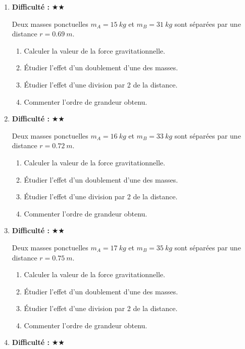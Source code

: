 \documentclass[11pt,a4paper]{article}
\newcommand{\etoiles}[1]{\textbf{Difficulté : }#1}
\begin{document}
\begin{enumerate}[label=\textbf{Exercice \arabic*.},leftmargin=*]
Deux masses ponctuelles $m_A=14\ \si{kg}$ et $m_B=29\ \si{kg}$ sont séparées par une distance $r=0.66\ \si{m}$.
\begin{enumerate}[label=\alph*)]
\item Calculer la valeur de la force gravitationnelle.
\item Étudier l'effet d'un doublement d'une des masses.
\item Étudier l'effet d'une division par 2 de la distance.
\item Commenter l'ordre de grandeur obtenu.
\end{enumerate}
\item \etoiles{★★}

Deux masses ponctuelles $m_A=15\ \si{kg}$ et $m_B=31\ \si{kg}$ sont séparées par une distance $r=0.69\ \si{m}$.
\begin{enumerate}[label=\alph*)]
\item Calculer la valeur de la force gravitationnelle.
\item Étudier l'effet d'un doublement d'une des masses.
\item Étudier l'effet d'une division par 2 de la distance.
\item Commenter l'ordre de grandeur obtenu.
\end{enumerate}
\item \etoiles{★★}

Deux masses ponctuelles $m_A=16\ \si{kg}$ et $m_B=33\ \si{kg}$ sont séparées par une distance $r=0.72\ \si{m}$.
\begin{enumerate}[label=\alph*)]
\item Calculer la valeur de la force gravitationnelle.
\item Étudier l'effet d'un doublement d'une des masses.
\item Étudier l'effet d'une division par 2 de la distance.
\item Commenter l'ordre de grandeur obtenu.
\end{enumerate}
\item \etoiles{★★}

Deux masses ponctuelles $m_A=17\ \si{kg}$ et $m_B=35\ \si{kg}$ sont séparées par une distance $r=0.75\ \si{m}$.
\begin{enumerate}[label=\alph*)]
\item Calculer la valeur de la force gravitationnelle.
\item Étudier l'effet d'un doublement d'une des masses.
\item Étudier l'effet d'une division par 2 de la distance.
\item Commenter l'ordre de grandeur obtenu.
\end{enumerate}
\item \etoiles{★★}


\end{enumerate}
\end{document}
